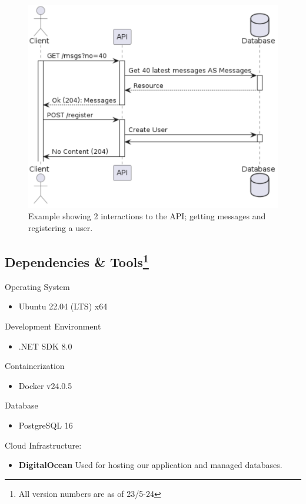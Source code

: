 \begin{figure}[H]
  \centering
  \includegraphics[width=0.75\linewidth]{Images/example_of_interaction.png}
  \caption{Example showing 2 interactions to the API; getting messages and registering a user.}
  \label{fig:example_interaction}
\end{figure}

\subsection[Dependencies \& Tools]{Dependencies \& Tools\footnote{All version numbers are as of 23/5-24}}

Operating System
\begin{itemize}
    \item Ubuntu 22.04 (LTS) x64
\end{itemize}

Development Environment
\begin{itemize}
    \item .NET SDK 8.0
\end{itemize}

Containerization
\begin{itemize}
    \item Docker v24.0.5
\end{itemize}

Database
\begin{itemize}
    \item PostgreSQL 16
\end{itemize}

Cloud Infrastructure:
\begin{itemize}
    \item \textbf{DigitalOcean} Used for hosting our application and managed databases.
\end{itemize}

